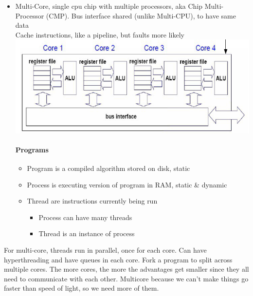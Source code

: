 \documentclass[12 pt]{article}
\begin{document}
\begin{itemize}
\item Multi-Core, single cpu chip with multiple processors, aka Chip Multi-Processor (CMP). Bus interface shared (unlike Multi-CPU), to have same data
\\ Cache instructions, like a pipeline, but faults more likely
\\ \includegraphics[scale=0.7]{mccc}
\paragraph{Programs}
\begin{itemize}
\item Program is a compiled algorithm stored on disk, static
\item Process is executing version of program in RAM, static \& dynamic
\item Thread are instructions currently being run
\begin{itemize}
\item Process can have many threads
\item Thread is an instance of process
\end{itemize}
\end{itemize}
\end{itemize}
For multi-core, threads run in parallel, once for each core. Can have hyperthreading and have queues in each core. Fork a program to split across multiple cores. The more cores, the more the advantages get smaller since they all need to communicate with each other. Multicore because we can't make things go faster than speed of light, so we need more of them.
\end{document}

